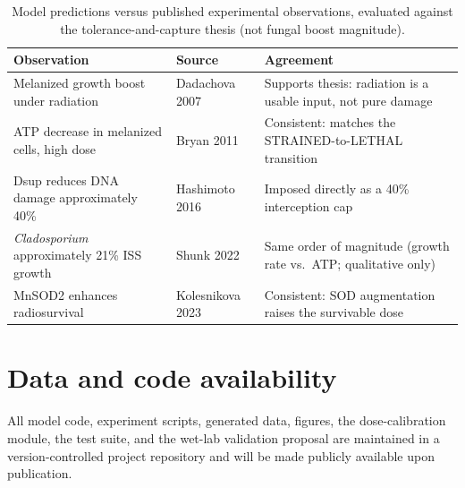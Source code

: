 \documentclass[11pt]{article}
\begin{document}
\begin{table}[t]
  \centering
  \small
  \caption{Model predictions versus published experimental observations, evaluated
  against the tolerance-and-capture thesis (not fungal boost magnitude).}
  \label{tab:validation}
  \begin{tabular}{@{}p{4.3cm}p{2.6cm}p{4.6cm}@{}}
    \toprule
    \textbf{Observation} & \textbf{Source} & \textbf{Agreement} \\
    \midrule
    Melanized growth boost under radiation & Dadachova 2007 &
    Supports thesis: radiation is a usable input, not pure damage \\
    ATP decrease in melanized cells, high dose & Bryan 2011 &
    Consistent: matches the STRAINED-to-LETHAL transition \\
    Dsup reduces DNA damage approximately 40\% & Hashimoto 2016 &
    Imposed directly as a 40\% interception cap \\
    \textit{Cladosporium} approximately 21\% ISS growth & Shunk 2022 &
    Same order of magnitude (growth rate vs.\ ATP; qualitative only) \\
    MnSOD2 enhances radiosurvival & Kolesnikova 2023 &
    Consistent: SOD augmentation raises the survivable dose \\
    \bottomrule
  \end{tabular}
\end{table}

\section*{Data and code availability}

All model code, experiment scripts, generated data, figures, the dose-calibration
module, the test suite, and the wet-lab validation proposal are maintained in a
version-controlled project repository and will be made publicly available upon
publication.

\end{document}
